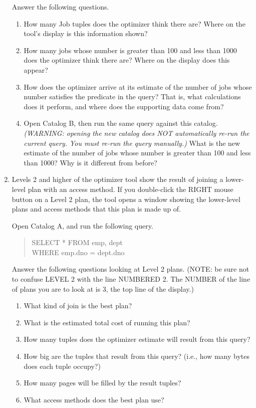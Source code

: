 \begin{enumerate}
Answer the following questions.
\begin{enumerate}
\item
How many Job tuples does the optimizer think there are?  Where on
the tool's display is this information shown?
\item
How many jobs whose number is greater than 100 and less than 1000 does
the optimizer think there are?  Where on the display does this appear?
\item
How does the optimizer arrive at its estimate of the number of jobs whose
number satisfies the predicate in the query?  That is, what calculations
does it perform, and where does the supporting data come from?
\item
Open Catalog B, then run the same query against this catalog.  {\em
(WARNING: opening the new catalog does NOT automatically re-run the
current query.  You must re-run the query manually.)}  What is the new
estimate of the number of jobs whose number is greater than 100 and less
than 1000?  Why is it different from before?
\end{enumerate}


\item

Levels 2 and higher of the optimizer tool show the result of joining a
lower-level plan with an access method.  If you double-click the RIGHT mouse
button on a Level 2 plan, the tool opens a window showing the lower-level
plans and access methods that this plan is made up of.

Open Catalog A, and run the following query.
\begin{quote}
        SELECT * FROM emp, dept\\
        WHERE emp.dno = dept.dno
\end{quote}

Answer the following
questions looking at Level 2 plans.  (NOTE: be sure not to confuse LEVEL 2
with the line NUMBERED 2.  The NUMBER of the line of plans you are to look
at is 3, the top line of the display.)
\begin{enumerate}
\item
What kind of join is the best plan?
\item
What is the estimated total cost of running this plan?
\item
How many tuples does the optimizer estimate will result from this query?
\item
How big are the tuples that result from this query?  (i.e., how many
bytes does each tuple occupy?)
\item
How many pages will be filled by the result tuples?
\item
What access methods does the best plan use?
\end{enumerate}



\end{enumerate}
